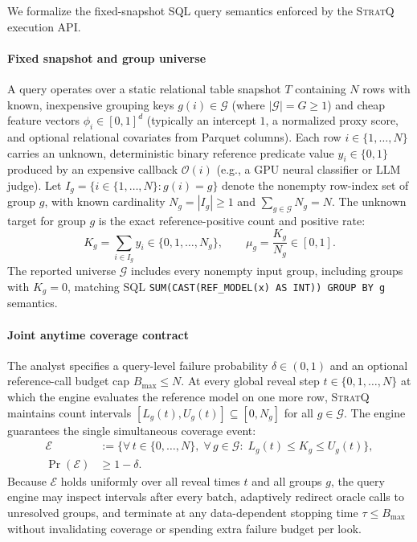 We formalize the fixed-snapshot SQL query semantics enforced by the \textsc{StratQ} execution API.

\paragraph{Fixed snapshot and group universe}
A query operates over a static relational table snapshot $T$ containing $N$ rows with known, inexpensive grouping keys $g(i) \in \mathcal{G}$ (where $|\mathcal{G}| = G \ge 1$) and cheap feature vectors $\phi_i \in [0, 1]^d$ (typically an intercept $1$, a normalized proxy score, and optional relational covariates from Parquet columns).
Each row $i \in \{1,\dots,N\}$ carries an unknown, deterministic binary reference predicate value $y_i \in \{0, 1\}$ produced by an expensive callback $\mathcal{O}(i)$ (e.g., a GPU neural classifier or LLM judge).
Let $I_g = \{i \in \{1,\dots,N\} : g(i) = g\}$ denote the nonempty row-index set of group $g$, with known cardinality $N_g = |I_g| \ge 1$ and $\sum_{g \in \mathcal{G}} N_g = N$.
The unknown target for group $g$ is the exact reference-positive count and positive rate:
\begin{equation}
  K_g = \sum_{i \in I_g} y_i \in \{0, 1, \dots, N_g\}, \qquad \mu_g = \frac{K_g}{N_g} \in [0, 1].
\end{equation}
The reported universe $\mathcal{G}$ includes every nonempty input group, including groups with $K_g = 0$, matching SQL \texttt{SUM(CAST(REF\_MODEL(x) AS INT)) GROUP BY g} semantics.

\paragraph{Joint anytime coverage contract}
The analyst specifies a query-level failure probability $\delta \in (0, 1)$ and an optional reference-call budget cap $B_{\max} \le N$.
At every global reveal step $t \in \{0, 1, \dots, N\}$ at which the engine evaluates the reference model on one more row, \textsc{StratQ} maintains count intervals $[L_g(t), U_g(t)] \subseteq [0, N_g]$ for all $g \in \mathcal{G}$.
The engine guarantees the single simultaneous coverage event:
\begin{align}
  \mathcal{E} &:= \bigl\{\forall\, t \in \{0,\dots,N\},\; \forall\, g \in \mathcal{G}:\; L_g(t) \le K_g \le U_g(t)\bigr\}, \nonumber\\
  \Pr(\mathcal{E}) &\ge 1 - \delta.
  \label{eq:joint-event}
\end{align}
Because $\mathcal{E}$ holds uniformly over all reveal times $t$ and all groups $g$, the query engine may inspect intervals after every batch, adaptively redirect oracle calls to unresolved groups, and terminate at any data-dependent stopping time $\tau \le B_{\max}$ without invalidating coverage or spending extra failure budget per look.

